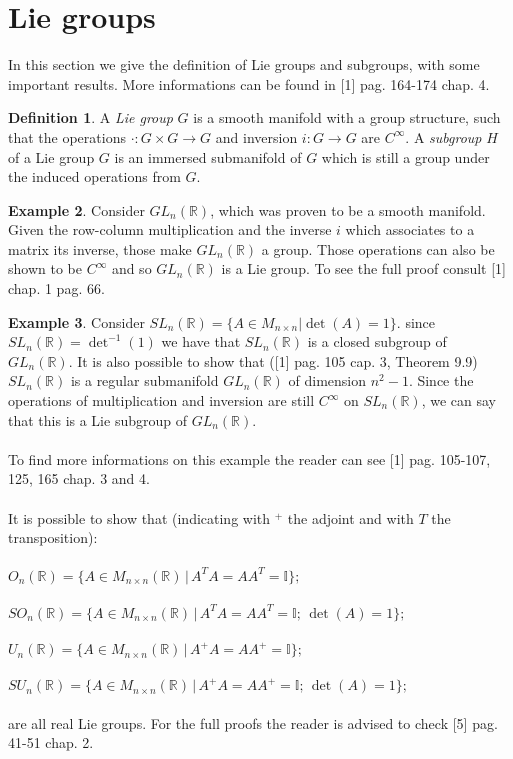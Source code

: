 \documentclass[12pt,a4paper]{report}
\theoremstyle{definition}
\newtheorem{Def}{Definition}[chapter]
\theoremstyle{Theorem}
\theoremstyle{definition}
\newtheorem{Ex}[Def]{Example}
\theoremstyle{definition}
\begin{document}
	\section{Lie groups}
	In this section we give the definition of Lie groups and subgroups, with some important results. More informations can be found in [1] pag. 164-174 chap. 4.
	\begin{Def}
		A \textit{Lie group} $G$ is a smooth manifold with a group structure, such that the operations $\cdot:G\times G\rightarrow G$ and inversion $i:G\rightarrow G$ are $C^\infty$.
		A \textit{subgroup} $H$ of a Lie group $G$ is an immersed submanifold of $G$ which is still a group under the induced operations from $G$.
	\end{Def}
	\begin{Ex}
		Consider $GL_n(\mathbb{R})$, which was proven to be a smooth manifold. Given the row-column multiplication and the inverse $i$ which associates to a matrix its inverse, those make $GL_n(\mathbb{R})$ a group. Those operations can also be shown to be $C^\infty$ and so $GL_n(\mathbb{R})$ is a Lie group. To see the full proof consult [1] chap. 1 pag. 66.
	\end{Ex}
	\begin{Ex}
		Consider $SL_n(\mathbb{R})=\{A\in M_{n\times n}| \det(A)=1\}$. since $SL_n(\mathbb{R})=\det^{-1}(1)$ we have that $SL_n(\mathbb{R})$ is a closed subgroup of $GL_n(\mathbb{R})$. It is also possible to show that ([1] pag. 105 cap. 3, Theorem 9.9) $SL_n(\mathbb{R})$ is a regular submanifold $GL_n(\mathbb{R})$ of dimension $n^2-1$. Since the operations of multiplication and inversion are still $C^\infty$ on $SL_n(\mathbb{R})$, we can say that this is a Lie subgroup of $GL_n(\mathbb{R})$.\\
		\\
		To find more informations on this example the reader can see [1] pag. 105-107, 125, 165 chap. 3 and 4.\\
		\\
		It is possible to show that (indicating with $^+$ the adjoint and with $T$ the transposition):\\\\
		$O_n(\mathbb{R})=\{A\in M_{n\times n}(\mathbb{R})\, |\, A^TA=AA^T=\mathbb{I}\};$\\\\
		$SO_n(\mathbb{R})=\{A\in M_{n\times n}(\mathbb{R})\, |\, A^TA=AA^T=\mathbb{I};\, \det(A)=1\};$\\\\
		$U_n(\mathbb{R})=\{A\in M_{n\times n}(\mathbb{R})\, |\, A^+A=AA^+=\mathbb{I}\};$\\\\
		$SU_n(\mathbb{R})=\{A\in M_{n\times n}(\mathbb{R})\, |\, A^+A=AA^+=\mathbb{I};\,\det(A)=1\};$\\\\
		are all real Lie groups. 
		For the full proofs the reader is advised to check [5] pag. 41-51 chap. 2.
	\end{Ex}
\end{document}

